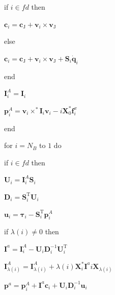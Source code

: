 \documentclass[10pt,a4paper]{book}
\theoremstyle{thmstyle} %
\theoremstyle{defstyle} %
\theoremstyle{prostyle} %
\begin{document}
if $i \in f d$ then



$ \boldsymbol{c}_{i}=\boldsymbol{c}_{\mathrm{J}}+\boldsymbol{v}_{i} \times \boldsymbol{v}_{\mathrm{J}}$



else



$ \boldsymbol{c}_{i}=\boldsymbol{c}_{\mathrm{J}}+\boldsymbol{v}_{i} \times \boldsymbol{v}_{\mathrm{J}}+\boldsymbol{S}_{i} \dot{\boldsymbol{q}}_{i}$



end



$ \boldsymbol{I}_{i}^{A}=\boldsymbol{I}_{i}$



$ \boldsymbol{p}_{i}^{A}=\boldsymbol{v}_{i} \times^{*} \boldsymbol{I}_{i} \boldsymbol{v}_{i}-i \boldsymbol{X}_{0}^{*} \boldsymbol{f}_{i}^{x}$



end



for $i=N_{B}$ to $1$ do



if $i \in f d$ then



$ \boldsymbol{U}_{i}=\boldsymbol{I}_{i}^{A} \boldsymbol{S}_{i}$



$ \boldsymbol{D}_{i}=\boldsymbol{S}_{i}^{\mathrm{T}} \boldsymbol{U}_{i}$



$ \boldsymbol{u}_{i}=\boldsymbol{\tau}_{i}-\boldsymbol{S}_{i}^{\mathrm{T}} \boldsymbol{p}_{i}^{A}$



if $\lambda(i) \neq 0$ then



$ \boldsymbol{I}^{a}=\boldsymbol{I}_{i}^{A}-\boldsymbol{U}_{i} \boldsymbol{D}_{i}^{-1} \boldsymbol{U}_{i}^{\mathrm{T}}$



$ \boldsymbol{I}_{\lambda(i)}^{A}=\boldsymbol{I}_{\lambda(i)}^{A}+\lambda(i) \boldsymbol{X}_{i}^{*} \boldsymbol{I}^{a} i \boldsymbol{X}_{\lambda(i)}$



$ \boldsymbol{p}^{a}=\boldsymbol{p}_{i}^{A}+\boldsymbol{I}^{a} \boldsymbol{c}_{i}+\boldsymbol{U}_{i} \boldsymbol{D}_{i}^{-1} \boldsymbol{u}_{i}$
\end{document}
